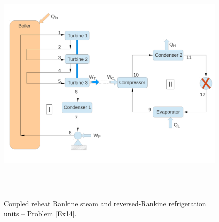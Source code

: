 \begin{enumerate}
\begin{figure}[h]
\begin{center}
\includegraphics[width=16.0cm,height=12.0cm]{./Pics/Overview_Refrig43}
\end{center}
\caption{Coupled reheat Rankine steam and reversed-Rankine refrigeration units --  Problem \ref{Ex14}.}\label{Ex14:Fig}
\end{figure}


\end{enumerate}
